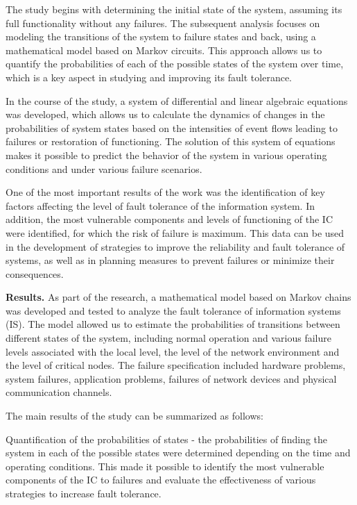 The study begins with determining the initial state of the system,
assuming its full functionality without any failures. The subsequent
analysis focuses on modeling the transitions of the system to failure
states and back, using a mathematical model based on Markov circuits.
This approach allows us to quantify the probabilities of each of the
possible states of the system over time, which is a key aspect in
studying and improving its fault tolerance.

In the course of the study, a system of differential and linear
algebraic equations was developed, which allows us to calculate the
dynamics of changes in the probabilities of system states based on the
intensities of event flows leading to failures or restoration of
functioning. The solution of this system of equations makes it possible
to predict the behavior of the system in various operating conditions
and under various failure scenarios.

One of the most important results of the work was the identification of
key factors affecting the level of fault tolerance of the information
system. In addition, the most vulnerable components and levels of
functioning of the IC were identified, for which the risk of failure is
maximum. This data can be used in the development of strategies to
improve the reliability and fault tolerance of systems, as well as in
planning measures to prevent failures or minimize their consequences.

\textbf{Results.} As part of the research, a mathematical model based on
Markov chains was developed and tested to analyze the fault tolerance of
information systems (IS). The model allowed us to estimate the
probabilities of transitions between different states of the system,
including normal operation and various failure levels associated with
the local level, the level of the network environment and the level of
critical nodes. The failure specification included hardware problems,
system failures, application problems, failures of network devices and
physical communication channels.

The main results of the study can be summarized as follows:

Quantification of the probabilities of states - the probabilities of
finding the system in each of the possible states were determined
depending on the time and operating conditions. This made it possible to
identify the most vulnerable components of the IC to failures and
evaluate the effectiveness of various strategies to increase fault
tolerance.

